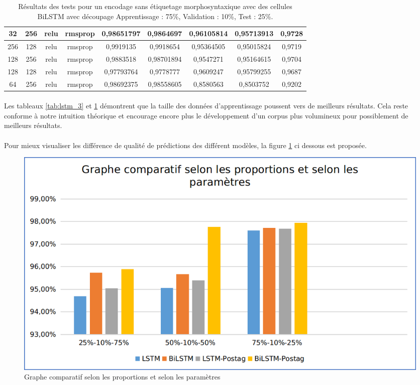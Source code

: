 \begin{table}[H]
{\begin{tabular}{|c|c|c|c|c|c|c|c|c|}
				32 & 256 & relu & rmsprop & 0,98651797 & 0,9864697 & 0,96105814 & 0,95713913 & 0,9728 \\ \hline
				256 & 128 & relu & rmsprop & 0,9919135 & 0,9918654 & 0,95364505 & 0,95015824 & 0,9719 \\ \hline
				128 & 256 & relu & rmsprop & 0,9883518 & 0,98701894 & 0,9547271 & 0,95164615 & 0,9704 \\ \hline
				128 & 128 & relu & rmsprop & 0,97793764 & 0,9778777 & 0,9609247 & 0,95799255 & 0,9687 \\ \hline
				64 & 256 & relu & rmsprop & 0,98692375 & 0,98558605 & 0,8580563 & 0,8503752 & 0,9202 \\ \hline
			\end{tabular}%
		}
		\caption{Résultats des tests pour un encodage sans étiquetage morphosyntaxique avec des cellules BiLSTM avec découpage Apprentissage : 75\%, Validation : 10\%, Test : 25\%.}
		\label{tab:bilstm_3}
	\end{table}
	\paragraph{}
	Les tableaux \ref{tab:lstm_3} et \ref{tab:bilstm_3} démontrent que la taille des données d'apprentissage poussent vers de meilleurs résultats. Cela reste conforme à notre intuition théorique et encourage encore plus le développement d'un corpus plus volumineux pour possiblement de meilleurs résultats.
	
	\paragraph{}
	Pour mieux visualiser les différence de qualité de prédictions des différent modèles, la figure \ref{compare} ci dessous est proposée.
	
	\begin{figure}[H]
		\centering
		\includegraphics[width=.9\linewidth]{images/implementation/graphs.png} 
		\caption{Graphe comparatif selon les proportions et selon les paramètres}
		\label{compare}
	\end{figure}
